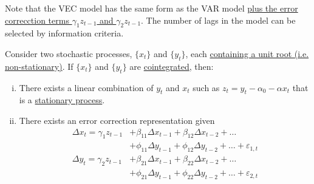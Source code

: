 \documentclass[11pt]{article}
\begin{document}
            \begin{remark}
                Note that the VEC model has the same form as the VAR model \ul{plus the error correcction terms $\gamma_1 z_{t-1}$ and $\gamma_2 z_{t-1}$}. The number of lags in the model can be selected by information criteria.
            \end{remark}
            
            \begin{theorem}
                Consider two stochastic processes, $\{x_t\}$ and $\{y_t\}$, each \ul{containing a unit root (i.e. non-stationary)}. If $\{x_t\}$ and $\{y_t\}$ are \ul{cointegrated}, then:
                \begin{enumerate}[(i)]
                    \item There exists a linear combination of $y_t$ and $x_t$ such as $z_t = y_t - \alpha_0 - \alpha x_t$ that is a \ul{stationary process}.
                    \item There exists an error correction representation given
                    \begin{align}
                        \Delta x_t = \gamma_1 z_{t-1} &+ \beta_{11} \Delta x_{t-1} + \beta_{12} \Delta x_{t-2} + \dots \\
                        &+ \phi_{11} \Delta y_{t-1} + \phi_{12} \Delta y_{t-2} + \dots + \varepsilon_{1, t} \\
                        \Delta y_t = \gamma_2 z_{t-1} &+ \beta_{21} \Delta x_{t-1} + \beta_{22} \Delta x_{t-2} + \dots \\
                        &+ \phi_{21} \Delta y_{t-1} + \phi_{22} \Delta y_{t-2} + \dots + \varepsilon_{2, t}
                    \end{align}
                \end{enumerate}
            \end{theorem}
            
\end{document}

